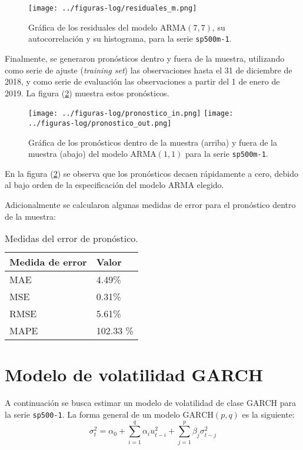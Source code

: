 \documentclass{article}
\begin{document}
\begin{figure}[H]
\centering
\texttt{[image: ../figuras-log/residuales\_m.png]}
\caption{\label{fig:residuales-m}Gráfica de los residuales del modelo $\mathrm{ARMA(7, 7)}$, su autocorrelación y su histograma, para la serie \texttt{sp500m-1}.}
\end{figure}

Finalmente, se generaron pronósticos dentro y fuera de la muestra, utilizando como serie de ajuste (\emph{training set}) las observaciones hasta el 31 de diciembre de 2018, y como serie de evaluación las observaciones a partir del 1 de enero de 2019. La figura (\ref{fig:pronosticos}) muestra estos pronósticos.

\begin{figure}[H]
\centering
\texttt{[image: ../figuras-log/pronostico\_in.png]}
\texttt{[image: ../figuras-log/pronostico\_out.png]}
\caption{\label{fig:pronosticos}Gráfica de los pronósticos dentro de la muestra (arriba) y fuera de la muestra (abajo) del modelo $\mathrm{ARMA(1, 1)}$ para la serie \texttt{sp500m-1}.}
\end{figure}

En la figura (\ref{fig:pronosticos}) se observa que los pronósticos decaen rápidamente a cero, debido al bajo orden de la especificación del modelo ARMA elegido.

Adicionalmente se calcularon algunas medidas de error para el pronóstico dentro de la muestra:

\begin{table}[H]
\centering
\begin{tabularx}{0.6\textwidth}{XY}
\toprule
Medida de error & Valor \\
\midrule
MAE & 4.49\% \\
MSE & 0.31\% \\
RMSE & 5.61\% \\
MAPE & 102.33 \% \\
\bottomrule
\end{tabularx}
\caption{\label{tab:medidas-error}Medidas del error de pronóstico.}
\end{table}


\newpage
\section{Modelo de volatilidad GARCH}

A continuación se busca estimar un modelo de volatilidad de clase GARCH para la serie \texttt{sp500-1}. La forma general de un modelo $\mathrm{GARCH}(p, q)$ es la siguiente:
\[ \sigma^2_t =  \alpha_0 + \sum_{i=1}^q \alpha_i u^2_{t-i} + \sum_{j=1}^p \beta_j \sigma^2_{t-j} \]
\end{document}
